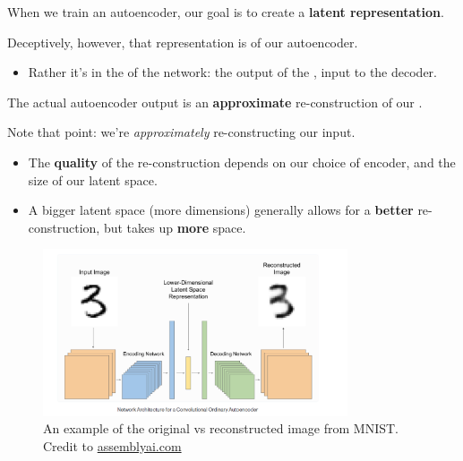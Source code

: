         \begin{clarification}
            When we train an autoencoder, our goal is to create a \textbf{latent representation}.

            Deceptively, however, that representation is  of our autoencoder.

            \begin{itemize}
                \item Rather it's in the  of the network: the output of the , input to the decoder.
            \end{itemize}

            The actual autoencoder output is an \textbf{approximate} re-construction of our .
            
        \end{clarification}

        Note that point: we're \textit{approximately} re-constructing our input.

        \begin{itemize}
            \item The \textbf{quality} of the re-construction depends on our choice of encoder, and the size of our latent space.
            \item A bigger latent space (more dimensions) generally allows for a \textbf{better} re-construction, but takes up \textbf{more} space.
        \end{itemize}

        \begin{figure}[H]
            \centering
            \includegraphics[width=90mm,scale=0.5]{images/autoencoder_images/assemblyai_reconstruction.png}

            \caption*{An example of the original vs reconstructed image from MNIST. Credit to \href{https://www.assemblyai.com/blog/introduction-to-variational-autoencoders-using-keras/}{assemblyai.com}}
        \end{figure}


